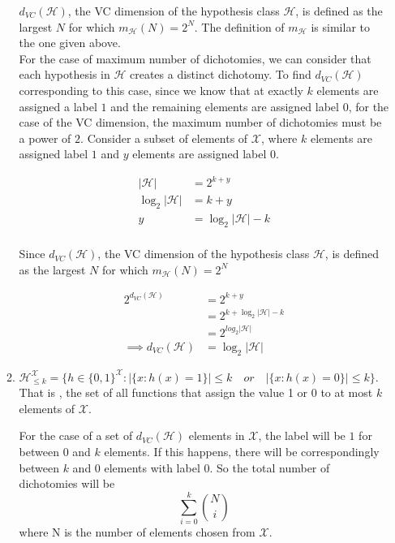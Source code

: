 \begin{enumerate}
\begin{enumerate}
$d_{VC}(\mathcal{H})$, the VC dimension of the hypothesis class $\mathcal{H}$, is defined as the largest $N$ for which $m_{\mathcal{H}}(N) = 2^N$. The definition of $m_{\mathcal{H}} $ is similar to the one given above.\\

For the case of maximum number of dichotomies, we can consider that each hypothesis in $\mathcal{H}$ creates a distinct dichotomy. To find $d_{VC}(\mathcal{H})$ corresponding to this case, since we know that at exactly $k$ elements are assigned a label $1$ and the remaining elements are assigned label $0$, for the case of the VC dimension, the maximum number of dichotomies must be a power of $2$. Consider a subset of elements of $\mathcal{X}$, where $k$ elements are assigned label $1$ and $y$ elements are assigned label $0$.

\begin{equation*}
\begin{aligned}
\left | \mathcal{H} \right | &= 2^{k + y}\\
\log_2 \left | \mathcal{H} \right | &= k+y\\
y &= \log_2 \left | \mathcal{H} \right | - k\\
\end{aligned}
\end{equation*}

Since $d_{VC}(\mathcal{H})$, the VC dimension of the hypothesis class $\mathcal{H}$, is defined as the largest $N$ for which $m_{\mathcal{H}}(N) = 2^N$

\begin{equation*}
\begin{aligned}
2^{d_{VC}(\mathcal{H})} &= 2^{k+y}\\
&= 2^{k+\log_2 \left | \mathcal{H} \right | - k}\\
&= 2^{log_2 \left | \mathcal{H} \right |}\\
\implies d_{VC}(\mathcal{H}) &= \log_2 \left | \mathcal{H} \right |
\end{aligned}
\end{equation*}

  \item  $\mathcal{H}_{\leq k}^{\mathcal{X}} = \{h \in
    \{0,1\}^\mathcal{X} : |\{x : h(x) = 1\} | \leq k \quad or \quad |\{x
      : h(x) = 0\} | \leq k\}$. That is , the set of all functions that
    assign the value 1 or 0 to at most $k$ elements of $\mathcal{X}$.

For the case of a set of $d_{VC}(\mathcal{H})$ elements in $\mathcal{X}$, the label will be $1$ for between $0$ and $k$ elements. If this happens, there will be correspondingly between $k$ and $0$ elements with label $0$. So the total number of dichotomies will be
$$
\sum_{i=0}^k {N \choose i}
$$
where N is the number of elements chosen from $\mathcal{X}$.


\end{enumerate}
\end{enumerate}
